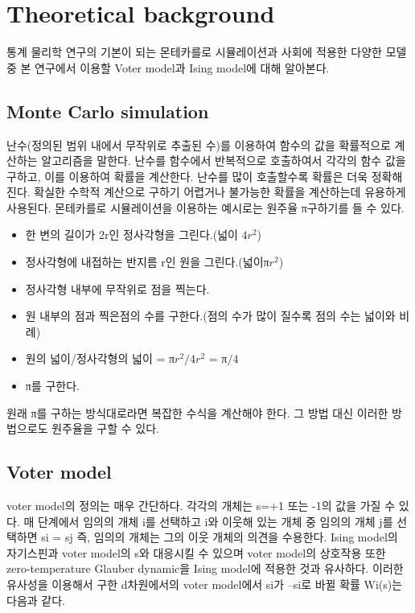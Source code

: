 \documentclass{gshs-report-v1.2}
\begin{document}
\section{Theoretical background}
통계 물리학 연구의 기본이 되는 몬테카를로 시뮬레이션과 사회에 적용한 다양한 모델 중 본 연구에서 이용할 Voter model과 Ising model에 대해 알아본다.

\subsection{Monte Carlo simulation}

난수(정의된 범위 내에서 무작위로 추출된 수)를 이용하여 함수의 값을 확률적으로 계산하는 알고리즘을 말한다. 난수를 함수에서 반복적으로 호출하여서 각각의 함수 값을 구하고, 이를 이용하여 확률을 계산한다. 난수를 많이 호출할수록 확률은 더욱 정확해진다. 확실한 수학적 계산으로 구하기 어렵거나 불가능한 확률을 계산하는데 유용하게 사용된다. 
몬테카를로 시뮬레이션을 이용하는 예시로는 원주율 π구하기를 들 수 있다. 

\begin{itemize}
	\item{한 변의 길이가 2r인 정사각형을 그린다.(넓이 $4r^2$)}
	\item{정사각형에 내접하는 반지름 r인 원을 그린다.(넓이π$r^2$)}
	\item{정사각형 내부에 무작위로 점을 찍는다. }
	\item{원 내부의 점과 찍은점의 수를 구한다.(점의 수가 많이 질수록 점의 수는 넓이와 비례)}
	\item{원의 넓이/정사각형의 넓이 = π$r^2/4r^2$ = π$/4$}
	\item{π를 구한다.}
\end{itemize}
원래 π를 구하는 방식대로라면 복잡한 수식을 계산해야 한다. 그 방법 대신 이러한 방법으로도 원주율을 구할 수 있다.


\subsection{Voter model}

voter model의 정의는 매우 간단하다. 각각의 개체는 s=+1 또는 -1의 값을 가질 수 있다. 매 단계에서 임의의 개체 i를 선택하고 i와 이웃해 있는 개체 중 임의의 개체 j를 선택하면 si = sj 즉, 임의의 개체는 그의 이웃 개체의 의견을 수용한다. Ising model의 자기스핀과 voter model의 s와 대응시킬 수 있으며 voter model의 상호작용 또한 zero-temperature Glauber dynamic을 Ising model에 적용한 것과 유사하다. 이러한 유사성을 이용해서 구한 \cite{Frachebourg96} d차원에서의 voter model에서 si가 –si로 바뀔 확률 Wi(s)는 다음과 같다.
\end{document}
